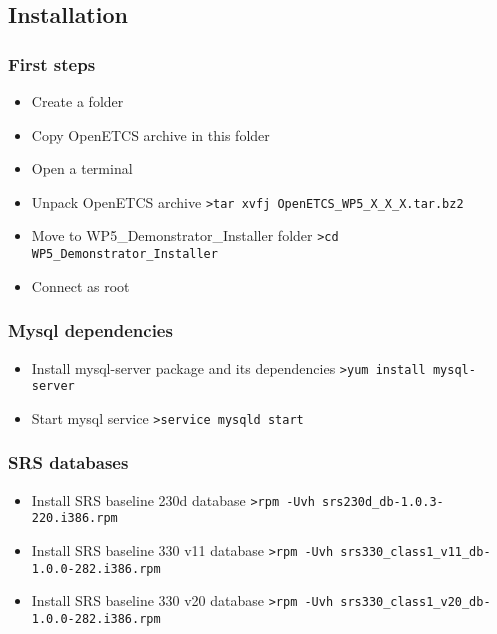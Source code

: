 \documentclass{template/openetcs_article}
\begin{document}
\subsection{Installation}
\subsubsection{First steps}
\begin{itemize}
	\item Create a folder
	\item Copy OpenETCS archive in this folder
	\item Open a terminal
	\item Unpack OpenETCS archive
\newline	
\verb|>tar xvfj OpenETCS_WP5_X_X_X.tar.bz2 |
	\item Move to WP5\_Demonstrator\_Installer folder
\newline	
\verb|>cd WP5_Demonstrator_Installer |	
	\item Connect as root
\end{itemize}
\subsubsection{Mysql dependencies}
\begin{itemize}
	\item Install mysql-server package and its dependencies
	\newline
	\verb|>yum install mysql-server |
	\item Start mysql service
	\newline
	\verb|>service mysqld start |
\end{itemize}	
\subsubsection{SRS databases}
\begin{itemize}
	\item Install SRS baseline 230d database
	\newline
	\verb|>rpm -Uvh srs230d_db-1.0.3-220.i386.rpm |	
	\item Install SRS baseline 330 v11 database
	\newline
	\verb|>rpm -Uvh srs330_class1_v11_db-1.0.0-282.i386.rpm |	
	\item Install SRS baseline 330 v20 database
	\newline
	\verb|>rpm -Uvh srs330_class1_v20_db-1.0.0-282.i386.rpm |		
\end{itemize}	
\end{document}
